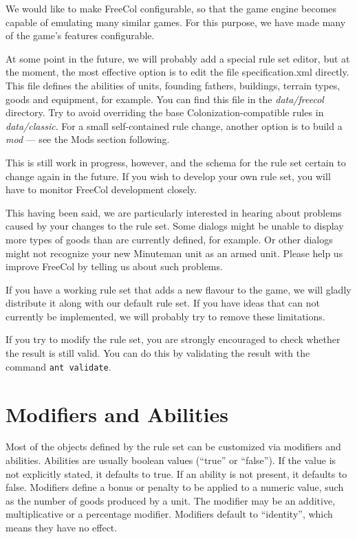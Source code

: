 \documentclass[12pt]{book}
\begin{document}
We would like to make FreeCol configurable, so that the game engine
becomes capable of emulating many similar games. For this purpose,
we have made many of the game's features configurable.

At some point in the future, we will probably add a special rule set
editor, but at the moment, the most effective option is to edit the file
specification.xml directly. This file defines the abilities of units,
founding fathers, buildings, terrain types, goods and equipment, for
example. You can find this file in the \textit{data/freecol}
directory.  Try to avoid overriding the base Colonization-compatible
rules in \textit{data/classic}.  For a small self-contained rule
change, another option is to build a \emph{mod} --- see the Mods
section following.

This is still work in progress, however, and the schema for the rule
set certain to change again in the future. If you wish to develop your
own rule set, you will have to monitor FreeCol development closely.

This having been said, we are particularly interested in hearing about
problems caused by your changes to the rule set. Some dialogs might be
unable to display more types of goods than are currently defined, for
example. Or other dialogs might not recognize your new Minuteman unit
as an armed unit. Please help us improve FreeCol by telling us about
such problems.

If you have a working rule set that adds a new flavour to the game, we
will gladly distribute it along with our default rule set. If you have
ideas that can not currently be implemented, we will probably try to
remove these limitations.

If you try to modify the rule set, you are strongly encouraged to
check whether the result is still valid. You can do this by validating
the result with the command \verb$ant validate$.


\hypertarget{Modifiers and Abilities}{\section{Modifiers and Abilities}}

Most of the objects defined by the rule set can be customized via
modifiers and abilities.  Abilities are usually boolean values
(``true'' or ``false''). If the value is not explicitly stated, it
defaults to true. If an ability is not present, it defaults to
false. Modifiers define a bonus or penalty to be applied to a numeric
value, such as the number of goods produced by a unit. The modifier
may be an additive, multiplicative or a percentage modifier. Modifiers
default to ``identity'', which means they have no effect.
\end{document}
